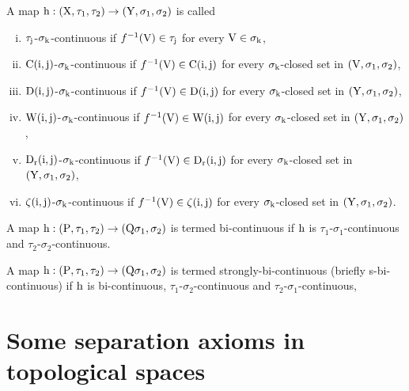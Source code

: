 \begin{dfn}\label{dfn1.6.2}
A map $\mathrm{h}:(\mathrm{X}, \tau_{1}, \tau_{2})\to (\mathrm{Y}, \sigma_{1}, \sigma_{2})$ is called
\begin{enumerate}[(i)]
\item $\tau_{\mathrm{j}}$-$\sigma_{\mathrm{k}}$-continuous \cite{Maki6} if $f^{-1}(\mathrm{V})\in \tau_{\mathrm{j}}$ for every $\mathrm{V}\in\sigma_{\mathrm{k}}$,

\item $\mathrm{C}(\mathrm{i},\mathrm{j})$-$\sigma_{\mathrm{k}}$-continuous \cite{Shaik John} if $f^{-1}(\mathrm{V})\in \mathrm{C}(\mathrm{i},\mathrm{j})$ for every $\sigma_{\mathrm{k}}$-closed set in $(\mathrm{V},\sigma_{1},\sigma_{2})$,

\item $\mathrm{D}(\mathrm{i},\mathrm{j})$-$\sigma_{\mathrm{k}}$-continuous \cite{Maki6} if $f^{-1}(\mathrm{V})\in \mathrm{D}(\mathrm{i},\mathrm{j})$ for every $\sigma_{\mathrm{k}}$-closed set in $(\mathrm{Y},\sigma_{1},\sigma_{2})$,

\item $\mathrm{W}(\mathrm{i},\mathrm{j})$-$\sigma_{\mathrm{k}}$-continuous \cite{Fukutake} if $f^{-1}(\mathrm{V})\in \mathrm{W}(\mathrm{i},\mathrm{j})$ for every $\sigma_{\mathrm{k}}$-closed set in $(\mathrm{Y},\sigma_{1},\sigma_{2})$,

\item $\mathrm{D}_{\mathrm{r}}(\mathrm{i},\mathrm{j})$-$\sigma_{\mathrm{k}}$-continuous \cite{Arockiarani} if $f^{-1}(\mathrm{V})\in \mathrm{D}_{\mathrm{r}}(\mathrm{i},\mathrm{j})$ for every $\sigma_{\mathrm{k}}$-closed set in $(\mathrm{Y},\sigma_{1},\sigma_{2})$,

\item $\zeta(\mathrm{i},\mathrm{j})$-$\sigma_{\mathrm{k}}$-continuous \cite{Gnanambal} if $f^{-1}(\mathrm{V})\in\zeta(\mathrm{i},\mathrm{j})$ for every $\sigma_{\mathrm{k}}$-closed set in $(\mathrm{Y},\sigma_{1},\sigma_{2})$.
\end{enumerate}
\end{dfn}

\begin{dfn}\label{dfn1.6.3}
A map $\mathrm{h}: (\mathrm{P}, \tau_1, \tau_2)\rightarrow(\mathrm{Q} \sigma_1, \sigma_2)$ is termed bi-continuous \cite{Maki6} if $\mathrm{h}$ is $\tau_1$-$\sigma_1$-continuous and $\tau_2$-$\sigma_2$-continuous.
\end{dfn}

\begin{dfn}\label{dfn1.6.4}
A map $\mathrm{h}: (\mathrm{P}, \tau_1, \tau_2)\rightarrow(\mathrm{Q} \sigma_1, \sigma_2)$ is termed strongly-bi-continuous \cite{Maki6} (briefly s-bi-continuous) if $\mathrm{h}$ is bi-continuous, $\tau_1$-$\sigma_2$-continuous and $\tau_2$-$\sigma_1$-{\break}continuous,
\end{dfn}

\section{Some separation axioms in topological spaces}

